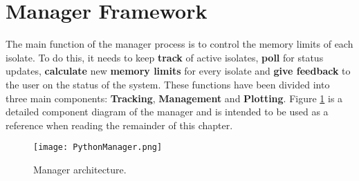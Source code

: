 \documentclass{l4proj}
\begin{document}
\section{Manager Framework}
\hspace*{1em} The main function of the manager process is to control the memory limits of each isolate. To do this, it needs to keep \textbf{track} of active isolates, \textbf{poll} for status updates, \textbf{calculate} new \textbf{memory limits} for every isolate and \textbf{give feedback} to the user on the status of the system. These functions have been divided into three main components: \textbf{Tracking}, \textbf{Management} and \textbf{Plotting}. Figure \ref{managerdetail} is a detailed component diagram of the manager and is intended to be used as a reference when reading the remainder of this chapter.
\begin{figure}[!ht]
  \centering
    \texttt{[image: PythonManager.png]}
  \caption{Manager architecture.}
    \label{managerdetail}
\end{figure}
\end{document}
